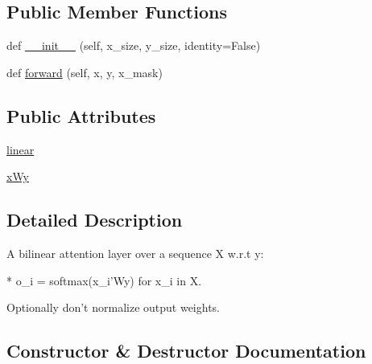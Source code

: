 \subsection*{Public Member Functions}
\begin{DoxyCompactItemize}
\item 
def \hyperlink{classparlai_1_1agents_1_1drqa_1_1layers_1_1BilinearSeqAttn_a78a4199a4dd90ac303f120cbe55af2a2}{\+\_\+\+\_\+init\+\_\+\+\_\+} (self, x\+\_\+size, y\+\_\+size, identity=False)
\item 
def \hyperlink{classparlai_1_1agents_1_1drqa_1_1layers_1_1BilinearSeqAttn_af6775803498ad914cd5e74cd228927e6}{forward} (self, x, y, x\+\_\+mask)
\end{DoxyCompactItemize}
\subsection*{Public Attributes}
\begin{DoxyCompactItemize}
\item 
\hyperlink{classparlai_1_1agents_1_1drqa_1_1layers_1_1BilinearSeqAttn_a9ec3eb5a5a3f38a5826b7dc02abbe925}{linear}
\item 
\hyperlink{classparlai_1_1agents_1_1drqa_1_1layers_1_1BilinearSeqAttn_a6a14946097618712765aba7243f0c075}{x\+Wy}
\end{DoxyCompactItemize}


\subsection{Detailed Description}
\begin{DoxyVerb}A bilinear attention layer over a sequence X w.r.t y:

* o_i = softmax(x_i'Wy) for x_i in X.

Optionally don't normalize output weights.
\end{DoxyVerb}
 

\subsection{Constructor \& Destructor Documentation}
\mbox{\label{classparlai_1_1agents_1_1drqa_1_1layers_1_1BilinearSeqAttn_a78a4199a4dd90ac303f120cbe55af2a2}} 
